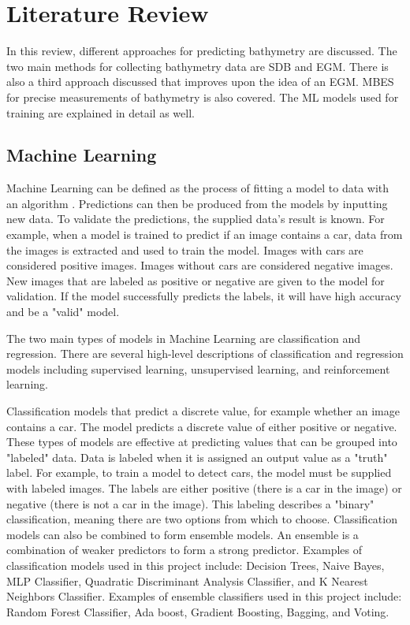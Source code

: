 \section{Literature Review}
\setlength{\parindent}{10ex}
In this review, different approaches for predicting bathymetry are discussed.
The two main methods for collecting bathymetry data are \ac{SDB} and \ac{EGM}.
There is also a third approach discussed that improves upon the idea of an \ac{EGM}.
\ac{MBES} for precise measurements of bathymetry \cite{farr1980multibeam} is also covered.
The \ac{ML} models used for training are explained in detail as well.

\subsection{Machine Learning}
Machine Learning can be defined as the process of fitting a model to data with an algorithm \cite{bishop2006pattern}.
Predictions can then be produced from the models by inputting new data.
To validate the predictions, the supplied data's result is known.
For example, when a model is trained to predict if an image contains a car, data from the images is extracted and used to train the model.
Images with cars are considered positive images.
Images without cars are considered negative images.
New images that are labeled as positive or negative are given to the model for validation.
If the model successfully predicts the labels, it will have high accuracy and be a "valid" model.

\par
The two main types of models in Machine Learning are classification and regression.
There are several high-level descriptions of classification and regression models including supervised learning, unsupervised learning, and reinforcement learning.

\par
Classification models that predict a discrete value, for example whether an image contains a car.
The model predicts a discrete value of either positive or negative.
These types of models are effective at predicting values that can be grouped into "labeled" data.
Data is labeled when it is assigned an output value as a "truth" label.
For example, to train a model to detect cars, the model must be supplied with labeled images. 
The labels are either positive (there is a car in the image) or negative (there is not a car in the image).
This labeling describes a "binary" classification, meaning there are two options from which to choose.
Classification models can also be combined to form ensemble models.
An ensemble is a combination of weaker predictors to form a strong predictor.
Examples of classification models used in this project include: Decision Trees, Naive Bayes, MLP Classifier, Quadratic Discriminant Analysis Classifier, and K Nearest Neighbors Classifier.
Examples of ensemble classifiers used in this project include: Random Forest Classifier, Ada boost, Gradient Boosting, Bagging, and Voting.


